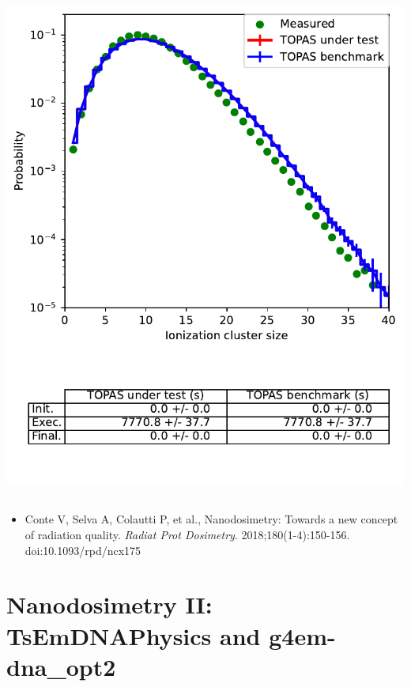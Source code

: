 \documentclass[aspectratio=1610]{beamer}
\begin{document}
\begin{frame}{\secname}
\begin{columns}
\begin{column}{0.4\linewidth}
     \includegraphics[width=\textwidth]{./NanodosimetryI/IDDistribution_opt6}
    \end{column}
   \end{columns}
\begin{itemize}
\item \tiny{Conte V, Selva A, Colautti P, et al., Nanodosimetry: Towards a new concept of radiation quality. \textit{Radiat Prot Dosimetry}. 2018;180(1-4):150-156. doi:10.1093/rpd/ncx175}
\end{itemize}
\end{frame}

\section{Nanodosimetry II: TsEmDNAPhysics and g4em-dna\_opt2}
\end{document}
